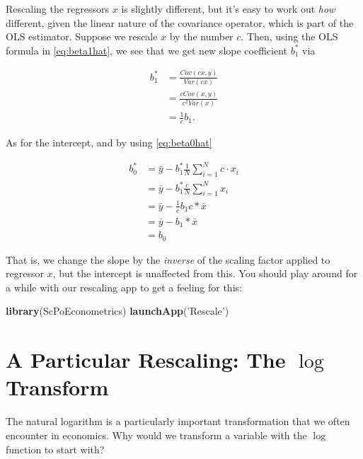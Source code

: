 \documentclass[]{book}
\newenvironment{Shaded}{\begin{snugshade}}{\end{snugshade}}
\newcommand{\KeywordTok}[1]{\textcolor[rgb]{0.13,0.29,0.53}{\textbf{#1}}}
\newcommand{\StringTok}[1]{\textcolor[rgb]{0.31,0.60,0.02}{#1}}
\newcommand{\NormalTok}[1]{#1}
\begin{document}
Rescaling the regressors \(x\) is slightly different, but it's easy to
work out \emph{how} different, given the linear nature of the covariance
operator, which is part of the OLS estimator. Suppose we rescale \(x\)
by the number \(c\). Then, using the OLS formula in \eqref{eq:beta1hat},
we see that we get new slope coefficient \(b_1^*\) via

\begin{align} 
b_1^* &= \frac{Cov(cx,y)}{Var(cx)} \\ 
      &= \frac{cCov(x,y)}{c^2 Var(x)} \\
      &= \frac{1}{c} b_1.
\end{align}

As for the intercept, and by using \eqref{eq:beta0hat}

\begin{align} 
b_0^* &= \bar{y} -             b_1^* \frac{1}{N}\sum_{i=1}^N c \cdot x_i \\ 
      &= \bar{y} -             b_1^* \frac{c}{N}\sum_{i=1}^N x_i  \\
      &= \bar{y} - \frac{1}{c} b_1 c * \bar{x}  \\
      &= \bar{y} -  b_1 * \bar{x}  \\
      &= b_0
\end{align}

That is, we change the slope by the \emph{inverse} of the scaling factor
applied to regressor \(x\), but the intercept is unaffected from this.
You should play around for a while with our rescaling app to get a
feeling for this:

\begin{Shaded}
\begin{Highlighting}[]
\KeywordTok{library}\NormalTok{(ScPoEconometrics)}
\KeywordTok{launchApp}\NormalTok{(}\StringTok{'Rescale'}\NormalTok{)}
\end{Highlighting}
\end{Shaded}

\section{\texorpdfstring{A Particular Rescaling: The \(\log\)
Transform}{A Particular Rescaling: The \textbackslash{}log Transform}}\label{a-particular-rescaling-the-log-transform}

The natural logarithm is a particularly important transformation that we
often encounter in economics. Why would we transform a variable with the
\(\log\) function to start with?
\end{document}
